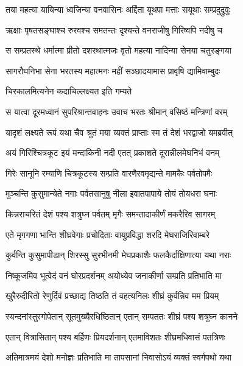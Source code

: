 
\twolineshloka
{तया महत्या यायिन्या ध्वजिन्या वनवासिनः}
{अर्द्दिता यूथपा मत्ताः सयूथाः सम्प्रदुद्रुवुः} %

\twolineshloka
{ऋक्षाः पृषतसङ्घाश्च रुरवश्च समतन्तः}
{दृश्यन्ते वनराजीषु गिरिष्वपि नदीषु च} %

\twolineshloka
{स सम्प्रतस्थे धर्मात्मा प्रीतो दशरथात्मजः}
{वृतो महत्या नादिन्या सेनया चतुरङ्गया} %

\twolineshloka
{सागरौघनिभा सेना भरतस्य महात्मनः}
{महीं सञ्छादयामास प्रावृषि द्यामिवाम्बुदः} %

\onelineshloka
{चिरकालमित्यनेन कदाचिल्लक्ष्यत इति गम्यते} %

\twolineshloka
{स यात्वा दूरमध्वानं सुपरिश्रान्तवाहनः}
{उवाच भरतः श्रीमान् वसिष्ठं मन्त्रिणां वरम्} %

\twolineshloka
{यादृशं लक्ष्यते रूपं यथा चैव श्रुतं मया}
{व्यक्तं प्राप्ताः स्म तं देशं भरद्वाजो यमब्रवीत्} %

\twolineshloka
{अयं गिरिश्चित्रकूट इयं मन्दाकिनी नदी}
{एतत् प्रकाशते दूरान्नीलमेघनिभं वनम्} %

\twolineshloka
{गिरेः सानूनि रम्याणि चित्रकूटस्य सम्प्रति}
{वारणैरवमृद्यन्ते मामकैः पर्वतोपमैः} %

\twolineshloka
{मुञ्चन्ति कुसुमान्येते नगाः पर्वतसानुषु}
{नीला इवातपापाये तोयं तोयधरा घनाः} %

\twolineshloka
{किन्नराचरितं देशं पश्य शत्रुघ्न पर्वतम्}
{मृगैः समन्तादाकीर्णं मकरैरिव सागरम्} %

\twolineshloka
{एते मृगगणा भान्ति शीघ्रवेगाः प्रचोदिताः}
{वायुप्रविद्धा शरदि मेघराजिरिवाम्बरे} %

\twolineshloka
{कुर्वन्ति कुसुमापीडान् शिरस्सु सुरभीनमी}
{मेघप्रकाशैः फलकैर्दाक्षिणात्या यथा नराः} %

\twolineshloka
{निष्कूजमिव भूत्वेदं वनं घोरप्रदर्शनम्}
{अयोध्येव जनाकीर्णा सम्प्रति प्रतिभाति मा} %

\twolineshloka
{खुरैरुदीरितो रेणुर्दिवं प्रच्छाद्य तिष्ठति}
{तं वहत्यनिलः शीघ्रं कुर्वन्निव मम प्रियम्} %

\twolineshloka
{स्यन्दनांस्तुरगोपेतान् सूतमुख्यैरधिष्ठितान्}
{एतान् सम्पततः शीघ्रं पश्य शत्रुघ्न कानने} %

\twolineshloka
{एतान् वित्रासितान् पश्य बर्हिणः प्रियदर्शनान्}
{एतमाविशतः शीघ्रमधिवासं पतत्रिणः} %

\twolineshloka
{अतिमात्रमयं देशो मनोज्ञः प्रतिभाति मा}
{तापसानां निवासोऽयं व्यक्तं स्वर्गपथो यथा} %

